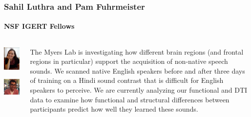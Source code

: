 \documentclass[aspectratio=169]{beamer}
\begin{document}
\begin{frame}
	\frametitle{Sahil Luthra and Pam Fuhrmeister}
	\framesubtitle{NSF IGERT Fellows}

	\begin{columns}[T]
		\begin{column}{.25\textwidth}
			\includegraphics[height=.5\textheight]{img/Fuhrmeister.jpg}

			\includegraphics[height=.5\textheight]{img/Luthra.jpg}
		\end{column}

		\begin{column}{.75\textwidth}
			The Myers Lab is investigating how different brain regions (and frontal regions in particular) support the acquisition of non-native speech sounds. We scanned native English speakers before and after three days of training on a Hindi sound contrast that is difficult for English speakers to perceive. We are currently analyzing our functional and DTI data to examine how functional and structural differences between participants predict how well they learned these sounds.
		\end{column}
	\end{columns}
\end{frame}
\end{document}
